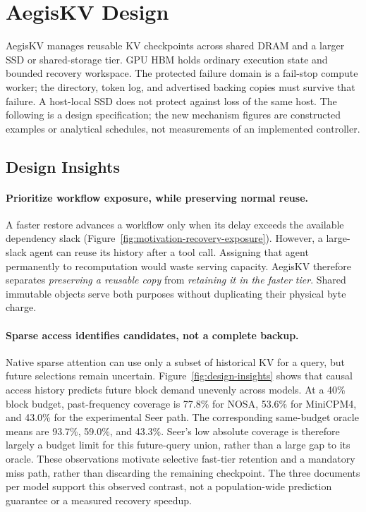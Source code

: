 \section{AegisKV Design}
\label{sec:design}

AegisKV manages reusable KV checkpoints across shared DRAM and a larger
SSD or shared-storage tier. GPU HBM holds ordinary execution state and
bounded recovery workspace. The protected failure domain is a fail-stop
compute worker; the directory, token log, and advertised backing copies
must survive that failure. A host-local SSD does not protect against loss
of the same host. The following is a design specification; the new
mechanism figures are constructed examples or analytical schedules, not
measurements of an implemented controller.

\subsection{Design Insights}
\label{sec:design-insights}

\paragraph{Prioritize workflow exposure, while preserving normal reuse.}
A faster restore advances a workflow only when its delay exceeds the
available dependency slack (Figure~\ref{fig:motivation-recovery-exposure}).
However, a large-slack agent can reuse its history after a tool call.
Assigning that agent permanently to recomputation would waste serving
capacity. AegisKV therefore separates \emph{preserving a reusable copy}
from \emph{retaining it in the faster tier}. Shared immutable objects
serve both purposes without duplicating their physical byte charge.

\paragraph{Sparse access identifies candidates, not a complete backup.}
Native sparse attention can use only a subset of historical KV for a
query, but future selections remain uncertain. Figure~\ref{fig:design-insights}
shows that causal access history predicts future block demand unevenly
across models. At a 40\% block budget, past-frequency coverage is 77.8\%
for NOSA, 53.6\% for MiniCPM4, and 43.0\% for the experimental Seer path.
The corresponding same-budget oracle means are 93.7\%, 59.0\%, and
43.3\%. Seer's low absolute coverage is therefore largely a budget limit
for this future-query union, rather than a large gap to its oracle.
These observations motivate selective fast-tier retention and a mandatory
miss path, rather than discarding the remaining checkpoint. The three
documents per model support this observed contrast, not a population-wide
prediction guarantee or a measured recovery speedup.

